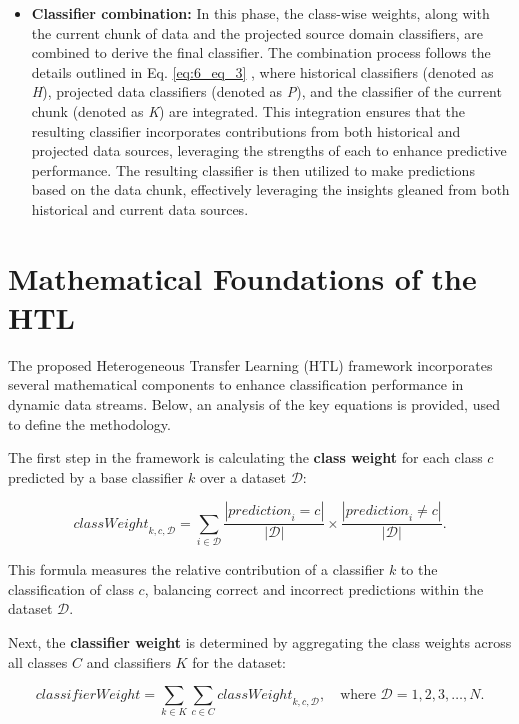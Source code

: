 \begin{itemize}
	\item \textbf{Classifier combination:} In this phase, the class-wise weights, along with the current chunk of data and the projected source domain classifiers, are combined to derive the final classifier. The combination process follows the details outlined in Eq. \ref{eq:6_eq_3} , where historical classifiers (denoted as \emph{H}), projected data classifiers (denoted as \emph{P}), and the classifier of the current chunk (denoted as \emph{K}) are integrated. This integration ensures that the resulting classifier incorporates contributions from both historical and projected data sources, leveraging the strengths of each to enhance predictive performance. The resulting classifier is then utilized to make predictions based on the data chunk, effectively leveraging the insights gleaned from both historical and current data sources.
\end{itemize}


\section{Mathematical Foundations of the HTL}

The proposed Heterogeneous Transfer Learning (HTL) framework incorporates several mathematical components to enhance classification performance in dynamic data streams. Below, an analysis of the key equations is provided, used to define the methodology.

The first step in the framework is calculating the \textbf{class weight} for each class \(c\) predicted by a base classifier \(k\) over a dataset \(\mathcal{D}\):

\begin{equation}
\label{eq:6_eq_1}
{classWeight}_{k,c,\mathcal{D}} = \sum_{i \in \mathcal{D}} \frac{|{prediction}_i = c|}{|\mathcal{D}|} \times \frac{|{prediction}_i \neq c|}{|\mathcal{D}|}.
\end{equation}

This formula measures the relative contribution of a classifier \(k\) to the classification of class \(c\), balancing correct and incorrect predictions within the dataset \(\mathcal{D}\).

Next, the \textbf{classifier weight} is determined by aggregating the class weights across all classes \(C\) and classifiers \(K\) for the dataset:

\begin{equation}
\label{eq:6_eq_2}
{classifierWeight} = \sum_{k \in K} \sum_{c \in C} {classWeight}_{k,c,\mathcal{D}}, \quad \text{where } \mathcal{D} = 1, 2, 3, \dots, N.
\end{equation}

